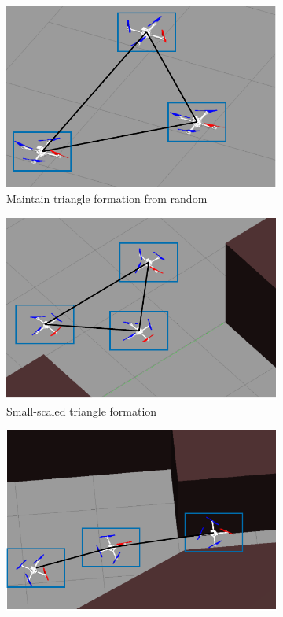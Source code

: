 \begin{figure}
    \centering
    \begin{subfigure}[b]{0.48\textwidth}
    \includegraphics[width=\textwidth]{paper2/images/gazebo_res1.pdf}
    \caption{Maintain triangle formation from random}
    \label{fig:1gazebo_1}
    \end{subfigure}
    \begin{subfigure}[b]{0.48\textwidth}
    \includegraphics[width=\textwidth]{paper2/images/gazebo_res2.pdf}
    \caption{Small-scaled triangle formation}
    \label{fig:1gazebo_2}
    \end{subfigure}
    \begin{subfigure}[b]{0.48\textwidth}
    \includegraphics[width=\textwidth]{paper2/images/gazebo_res3.pdf}

\end{subfigure}
\end{figure}
